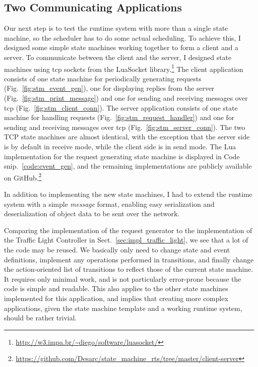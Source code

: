 \subsection{Two Communicating Applications}
\label{sec:client_server_app}
Our next step is to test the runtime system with more than a single state machine, so the scheduler has to do some actual scheduling. To achieve this, I designed some simple state machines working together to form a client and a server. To communicate between the client and the server, I designed state machines using \gls{tcp} sockets from the LuaSocket library.\footnote{\url{http://w3.impa.br/~diego/software/luasocket/}} The client application consists of one state machine for periodically generating requests (Fig.~\ref{fig:stm_event_gen}), one for displaying replies from the server (Fig.~\ref{fig:stm_print_message}) and one for sending and receiving messages over \gls{tcp} (Fig.~\ref{fig:stm_client_conn}). The server application consists of one state machine for handling requests (Fig.~\ref{fig:stm_request_handler}) and one for sending and receiving messages over \gls{tcp} (Fig.~\ref{fig:stm_server_conn}). The two TCP state machines are almost identical, with the exception that the server side is by default in receive mode, while the client side is in send mode.
The Lua implementation for the request generating state machine is displayed in Code snip.~\ref{code:event_gen}, and the remaining implementations are publicly available on GitHub.\footnote{\url{https://github.com/Desarc/state_machine_rts/tree/master/client-server}}

\noindent
In addition to implementing the new state machines, I had to extend the runtime system with a simple \emph{message} format, enabling easy serialization and deserialization of object data to be sent over the network.

\noindent
Comparing the implementation of the request generator to the implementation of the Traffic Light Controller in Sect.~\ref{sec:impl_traffic_light}, we see that a lot of the code may be reused. We basically only need to change state and event definitions, implement any operations performed in transitions, and finally change the action-oriented list of transitions to reflect those of the current state machine. It requires only minimal work, and is not particularly error-prone because the code is simple and readable. This also applies to the other state machines implemented for this application, and implies that creating more complex applications, given the state machine template and a working runtime system, should be rather trivial.

